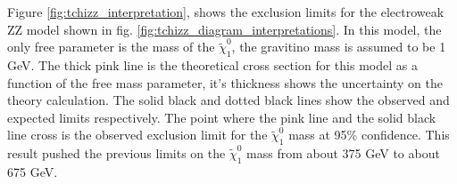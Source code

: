 \begin{figure}[!h]
{      }
    \end{figure}

    Figure \ref{fig:tchizz_interpretation}, shows the exclusion limits for the electroweak ZZ model shown in fig. \ref{fig:tchizz_diagram_interpretations}. In this model, the only free parameter is the mass of the $\widetilde{\chi}^0_1$, the gravitino mass is assumed to be 1 GeV. The thick pink line is the theoretical cross section for this model as a function of the free mass parameter, it's thickness shows the uncertainty on the theory calculation. The solid black and dotted black lines show the observed and expected limits respectively. The point where the pink line and the solid black line cross is the observed exclusion limit for the $\widetilde{\chi}^0_1$ mass at 95\% confidence. This result pushed the previous limits on the $\widetilde{\chi}^0_1$ mass from about 375 GeV to about 675 GeV.



